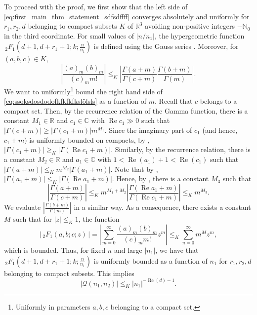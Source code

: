 \documentclass[]{article}
\renewcommand{\Re}{\operatorname{Re}}
\begin{document}
To proceed with the proof, we first show that the left side of \eqref{eq:first_main_thm_statement_sdfsdffff} converges absolutely and uniformly for $r_1, r_2, d$ belonging to compact subsets $K$ of $\mathbb{R}^3$ avoiding non-positive integers $-\mathbb{N}_0$ in the third coordinate.
For small values of $|n/n_1|$, the hypergeometric function $\, _2 F_1 (d+1,d+r_1+1;k;\frac{n}{n_1})$ is defined using the Gauss series \cite[15.2.1]{NIST}. Moreover, for $(a,b,c) \in K$, 
\begin{equation}\label{eq:ssoksdosdodofkfkfkfkslölsls}
\left| \frac{(a)_m (b)_m}{(c)_m m!} \right|   \le_K \left| \frac{\Gamma(a+m)}{\Gamma(c+m)}  \frac{\Gamma(b+m)}{\Gamma(m)} \right|.
\end{equation}
We want to uniformly\footnote{Uniformly in parameters $a, b, c$ belonging to a compact set.} bound the right hand side of \eqref{eq:ssoksdosdodofkfkfkfkslölsls} as a function of $m$. Recall that $c$ belongs to a compact set. Then, by the recurrence relation of the Gamma function,  there is a constant $M_1 \in \mathbb{R}$ and $c_1 \in \mathbb{C}$ with $\Re c_1 \gg 0$ such that $|\Gamma(c+m)| \ge |\Gamma(c_1+m)| m^{M_1} $.  Since the imaginary part of $c_1$ (and hence, $c_1+m$) is uniformly bounded on compacts, by \cite[5.6.7]{NIST}, $|\Gamma(c_1+m)| \ge_K |\Gamma(\Re c_1+m)| $. Similarly, by the recurrence relation, there is a constant $M_2 \in \mathbb{R}$ and $a_1 \in \mathbb{C}$ with $1 < \Re(a_1) + 1 < \Re(c_1)$ such that $|\Gamma(a+m) | \le_K m^{M_2} |\Gamma(a_1+m)|$. Note that by \cite[5.6.6]{NIST}, $|\Gamma(a_1+m)| \le_K |\Gamma(\Re a_1+m)| $. Hence, by \cite[5.6.8]{NIST}, there is a constant  $M_3$ such that 
\begin{equation}
    \left|  \frac{\Gamma(a+m)}{\Gamma(c+m)} \right| \le_K   m^{M_1+M_2}  \left|  \frac{\Gamma(\Re a_1+m)}{\Gamma(\Re c_1+m)} \right| \le_K m^{M_3}.
\end{equation}
We evaluate $\left| \frac{\Gamma(b+m)}{\Gamma(m)} \right| $ in a similar way. As a consequence, there exists a constant $M$ such that for $|z| \le_K 1$, the function 
\begin{equation}
|\, _2F_1(a, b; c; z) \, | = \left|\sum_{m=0}^{\infty} \frac{(a)_m (b)_m}{(c)_m m!} z^m \right| \le_K \sum_{n=0}^{\infty} m^M z^m,    
\end{equation}
which is bounded. 
Thus, for fixed $n$ and large $|n_1|$, we have that $  \, _2 F_1 (d+1,d+r_1+1;k;\frac{n}{n_1})$ is uniformly bounded as a function of $n_1$ for $r_1, r_2, d$ belonging to compact subsets.
This implies 
\begin{equation}
    |\mathcal{Q}(n_1,n_2)| \le_K |n_1|^{-\Re(d)-1}.
\end{equation}  
\end{document}

